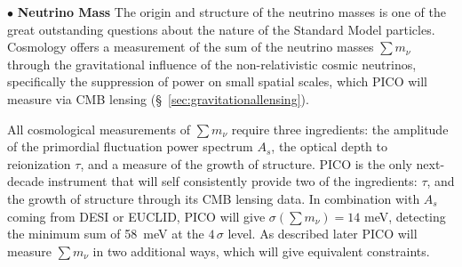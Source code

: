 \documentclass[PICOAPC.tex]{subfiles}
\begin{document}
\noindent$\bullet$ {\bf Neutrino Mass} \hspace{0.1in} \label{neutrino_fundamental} The origin and structure of the neutrino masses is one of the great outstanding  questions about the nature of the Standard Model particles.  
Cosmology offers a  measurement of the sum of the neutrino masses $\sum m_\nu$ through the gravitational influence of the non-relativistic  cosmic neutrinos, specifically the suppression of power on small spatial scales, which PICO will measure via CMB lensing (\S~\ref{sec:gravitationallensing}).

All cosmological measurements of $\sum m_\nu$ require three ingredients: the amplitude of the primordial fluctuation power spectrum $A_s$, the optical depth to reionization $\tau$, and a measure of the growth of structure. PICO is the only next-decade instrument that will self consistently provide two of the ingredients: $\tau$, and the growth of structure through its CMB lensing data. In combination with $A_{s}$ coming from DESI or EUCLID, PICO will give $\sigma(\sum m_\nu) = 14$ meV, detecting the minimum sum of 58~meV at the $4\,\sigma$ level. {\comred As described later} PICO will measure  $\sum m_\nu$ in two additional ways, which will give equivalent constraints. 


\end{document}

